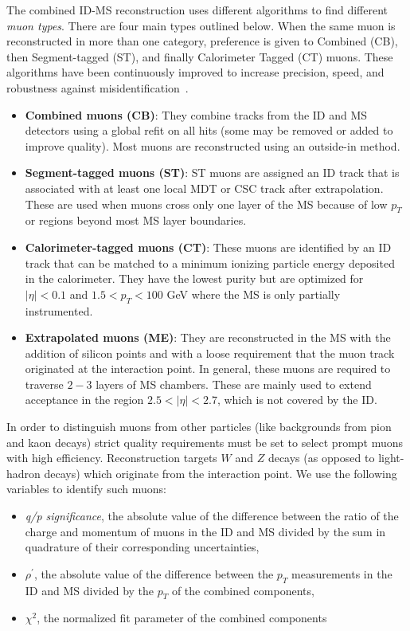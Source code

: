 The combined ID-MS reconstruction uses different algorithms to find different \textit{muon types}. There are four main types outlined below. When the same muon is reconstructed in more than one category, preference is given to Combined (CB), then Segment-tagged (ST), and finally Calorimeter Tagged (CT) muons. These algorithms have been continuously improved to increase precision, speed, and robustness against misidentification~\cite{MCPpaper}.  

\begin{itemize}
\item \textbf{Combined muons (CB)}: They combine tracks from the ID and MS detectors using a global refit on all hits (some may be removed or added to improve quality). Most muons are reconstructed using an outside-in method. 
\item \textbf{Segment-tagged muons (ST)}: ST muons are assigned an ID track that is associated with at least one local MDT or CSC track after extrapolation. These are used when muons cross only one layer of the MS because of low $p_T$ or regions beyond most MS layer boundaries. 
\item \textbf{Calorimeter-tagged muons (CT)}: These muons are identified by an ID track that can be matched to a minimum ionizing particle energy deposited in the calorimeter. They have the lowest purity but are optimized for $|\eta|  < 0.1$ and $1.5 < p_T < 100$ GeV where the MS is only partially instrumented. 
\item \textbf{Extrapolated muons (ME)}: They are reconstructed in the MS with the addition of silicon points and with a loose requirement that the muon track originated at the interaction point. In general, these muons are required to traverse $2-3$ layers of MS chambers. These are mainly used to extend acceptance in the region $2.5 < |\eta| < 2.7$, which is not covered by the ID. 
\end{itemize}

In order to distinguish muons from other particles (like backgrounds from pion and kaon decays) strict quality requirements must be set to select prompt muons with high efficiency. Reconstruction targets $W$ and $Z$ decays (as opposed to light-hadron decays) which originate from the interaction point. We use the following variables to identify such muons:
\begin{itemize}
\item \textit{q/p significance}, the absolute value of the difference between the ratio of the charge and momentum of muons in the ID and MS divided by the sum in quadrature of their corresponding uncertainties,
\item \textit{$\rho^\prime$}, the absolute value of the difference between the $p_T$ measurements in the ID and MS divided by the $p_T$ of the combined components, 
\item \textit{$\chi ^2$}, the normalized fit parameter of the combined components
\end{itemize}

